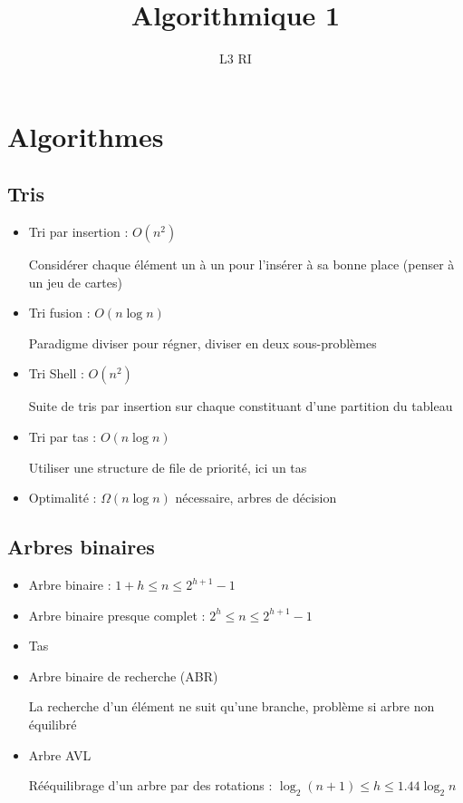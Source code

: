 \documentclass[10pt,a4paper]{article}
\begin{document}
\title{Algorithmique 1}
\author{L3 RI}
\date{}

\maketitle

\tableofcontents


\section{Algorithmes}

\subsection{Tris}

%
\begin{itemize}[noitemsep]
	\item Tri par insertion : \(  O(n^2)  \)
		
		Considérer chaque élément un à un pour l'insérer à sa bonne place (penser à un jeu de cartes)
		
	\item Tri fusion : \(  O(n\log n)  \)
		
		Paradigme diviser pour régner, diviser en deux sous-problèmes
	\item Tri Shell : \(  O(n^2)  \)
	
		Suite de tris par insertion sur chaque constituant d'une partition du tableau
		
	\item Tri par tas : \(  O(n\log n)  \)
	
		Utiliser une structure de file de priorité, ici un tas
	\item Optimalité : \(  \Omega (n \log n)  \) nécessaire, arbres de décision
\end{itemize}
%



\subsection{Arbres binaires}

%
\begin{itemize}[noitemsep]
	\item Arbre binaire : \(  1+h \leq n \leq 2^{h+1}-1  \)
	\item Arbre binaire presque complet : %
		\(  2^h \leq n \leq 2^{h+1}-1  \)
	\item Tas
	\item Arbre binaire de recherche (ABR)
	
		La recherche d'un élément ne suit qu'une branche, problème si arbre non équilibré
	\item Arbre AVL
	
		Rééquilibrage d'un arbre par des rotations :
		\(  \log _2(n+1) \leq h \leq 1.44\log _2 n  \)
	
\end{itemize}
%
\end{document}

